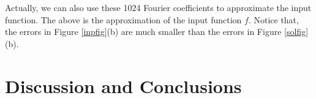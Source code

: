 \documentclass[graybox,footinfo]{svmult}
\newcommand{\DHJRnorm}[2][{}]{\ensuremath{\left \lVert #2 \right \rVert}_{#1}}
\newcommand{\DHJRabs}[1]{\ensuremath{{\left \lvert #1 \right \rvert}}}
\begin{document}
Actually, we can also use these 1024 Fourier coefficients to approximate the input function. The above is the approximation of the input function $f$. Notice that, the errors in Figure \ref{inpfig}(b) are much smaller than the errors in Figure \ref{solfig}(b). 


%
%

\section{Discussion and Conclusions} \label{sec:conc}



\end{document}
